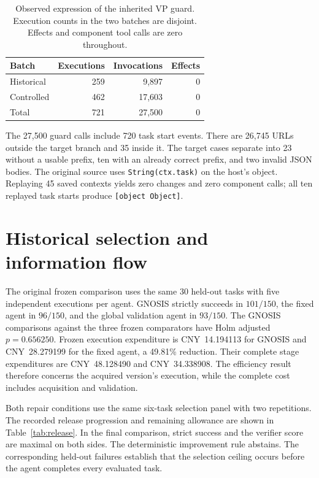 \begin{table}[t]
\centering
\caption{Observed expression of the inherited VP guard. Execution counts in the two batches are disjoint. Effects and component tool calls are zero throughout.}
\label{tab:guard}
\small
\renewcommand{\arraystretch}{1.13}
\begin{tabular*}{\columnwidth}{@{\extracolsep{\fill}}lrrr@{}}
\toprule
Batch & Executions & Invocations & Effects\\
\midrule
Historical & 259 & 9,897 & 0\\
Controlled & 462 & 17,603 & 0\\
\midrule
Total & 721 & 27,500 & 0\\
\bottomrule
\end{tabular*}
\end{table}

The 27,500 guard calls include 720 task start events. There are 26,745 URLs outside the target branch and 35 inside it. The target cases separate into 23 without a usable prefix, ten with an already correct prefix, and two invalid JSON bodies. The original source uses \texttt{String(ctx.task)} on the host's object. Replaying 45 saved contexts yields zero changes and zero component calls; all ten replayed task starts produce \texttt{[object Object]}.

\section{Historical selection and information flow}
\label{sec:history-controls}

The original frozen comparison uses the same 30 held-out tasks with five independent executions per agent. GNOSIS strictly succeeds in $101/150$, the fixed agent in $96/150$, and the global validation agent in $93/150$. The GNOSIS comparisons against the three frozen comparators have Holm adjusted $p=0.656250$. Frozen execution expenditure is CNY~14.194113 for GNOSIS and CNY~28.279199 for the fixed agent, a 49.81\% reduction. Their complete stage expenditures are CNY~48.128490 and CNY~34.338908. The efficiency result therefore concerns the acquired version's execution, while the complete cost includes acquisition and validation.

Both repair conditions use the same six-task selection panel with two repetitions. The recorded release progression and remaining allowance are shown in Table~\ref{tab:release}. In the final comparison, strict success and the verifier score are maximal on both sides. The deterministic improvement rule abstains. The corresponding held-out failures establish that the selection ceiling occurs before the agent completes every evaluated task.

